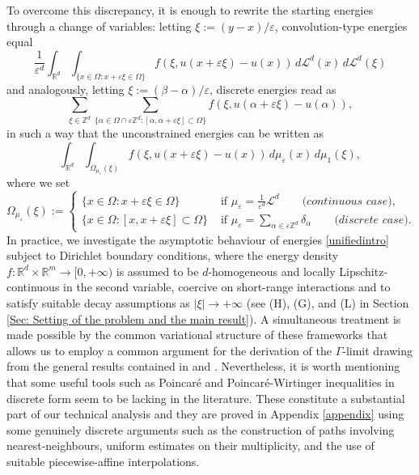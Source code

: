 \documentclass{article}
\theoremstyle{plain}
\theoremstyle{definition}
\def\e{\varepsilon}
\def\rr{{\mathbb R}}
\def\ZZ{{\mathbb Z}}
\numberwithin{equation}{section}
\begin{document}
To overcome this discrepancy, it is enough to rewrite the starting energies through a change of variables: letting $\xi:=(y-x)/\e$, convolution-type energies equal
\begin{equation*}
    \frac{1}{\e^{d}}\int_{\rr^d}\int_{\{x\in\Omega : x+\e\xi\in\Omega\}}f(\xi, u(x+\e\xi)-u(x))\, d\mathcal{L}^d(x)\, d\mathcal{L}^d(\xi)
\end{equation*}
and analogously, letting $\xi:=(\beta-\alpha)/\e$, discrete energies read as 
\begin{equation*}
 \sum_{\xi\in\ZZ^d} \sum_{\{\alpha\in \Omega\cap\e\ZZ^d: [\alpha,\alpha+\e\xi]\subset \Omega\}}f(\xi, u(\alpha+\e\xi)-u(\alpha)),
\end{equation*}
in such a way that the unconstrained energies can be written as
\begin{equation}\label{unifiedintro}
    \int_{\mathbb R^d}
\int_{\Omega_{\mu_\e}(\xi)}
f(\xi,u(x+\e\xi)-u(x))\, 
d\mu_\e(x)\,d\mu_1(\xi),
\end{equation}
where we set
\begin{equation*}
    \Omega_{\mu_\e}(\xi):=\begin{cases}
        \{x\in \Omega: x+\e\xi \in \Omega\} & \text{ if } \mu_\e=\displaystyle\frac{1}{\e^d}\mathcal{L}^d \qquad  \textit{(continuous case),} \\[7pt]
        \{x\in \Omega: [x,x+\e\xi]\subset \Omega\} & \text{ if } \displaystyle \mu_\e=\sum_{\alpha\in \e\ZZ^d}\delta_\alpha  \qquad \textit{(discrete case).}
    \end{cases}
\end{equation*}
In practice, we investigate the asymptotic behaviour of energies \eqref{unifiedintro} subject to Dirichlet boundary conditions, where the energy density
$f:\mathbb R^d\times\mathbb R^m\to[0,+\infty)$
is assumed to be $d$-homogeneous and locally Lipschitz-continuous in the second variable, coercive on short-range interactions and to satisfy suitable decay assumptions as $|\xi| \to +\infty$ (see (H), (G), and (L) in Section \ref{Sec: Setting of the problem and the main result}). A simultaneous treatment is made possible by the common variational structure of these frameworks that allows us to employ a common argument for the derivation of the $\Gamma$-limit drawing from the general results contained in \cite{AABPT}  and \cite{AliCic}. Nevertheless, it is worth mentioning that some useful tools such as Poincaré and Poincaré-Wirtinger inequalities in discrete form seem to be lacking in the literature. These constitute a substantial part of our technical analysis and they are proved in Appendix \ref{appendix} using some genuinely discrete arguments such as the construction of paths involving nearest-neighbours, uniform estimates on their multiplicity, and the use of suitable piecewise-affine interpolations.
\end{document}
